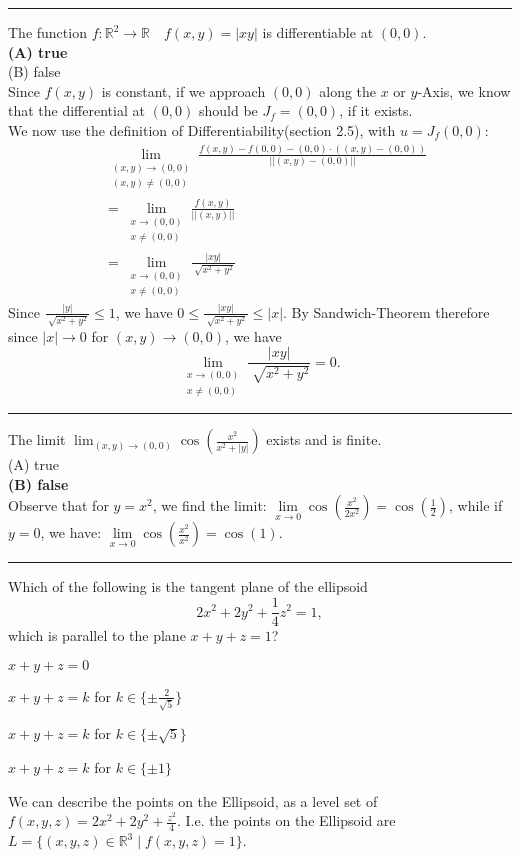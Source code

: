 \documentclass[a4paper,fontsize = 10pt]{article}
\newcommand{\cmark}{\ding{51}}%
\newcommand{\correct}{\rlap{$\square$}{\raisebox{2pt}{\hspace{1pt}\cmark}}\hspace{-2.5pt}}
\def\R{\mathbb{R}}
\begin{document}
\vspace{0.1 cm}
\hrule
\vspace{0.2 cm}
The function $f: \R^2 \to \R \quad f(x,y) = |xy|$ is differentiable at $(0,0)$.
\\\textbf{(A) true}
\\(B) false
\\Since $f(x,y)$ is constant, if we approach $(0,0)$ along the $x$ or $y$-Axis, we know that the differential at $(0,0)$ should be $J_f = (0,0)$, if it exists.
\\We now use the definition of Differentiability(section 2.5), with $u = J_f(0,0)$:
\begin{align*}
  &\lim_{\substack{(x,y) \to (0,0) \\ (x,y) \neq (0,0)}} \frac{f(x,y)-f(0,0)-(0,0)\cdot((x,y)-(0,0))}{||(x,y)-(0,0)||}\\
  &= \lim_{\substack{x \to (0,0) \\ x \neq (0,0)}} \frac{f(x,y)}{||(x,y)||}\\
  &= \lim_{\substack{x \to (0,0) \\ x \neq (0,0)}} \frac{|xy|}{\sqrt[]{x^2+y^2}}
\end{align*}
Since $\frac{|y|}{\sqrt[]{x^2+y^2}} \leq 1$, we have $0 \leq\frac{|xy|}{\sqrt[]{x^2+y^2}} \leq |x|$. 
By Sandwich-Theorem therefore since $|x| \to 0$ for $(x,y) \to (0,0)$, we have 
\[\lim_{\substack{x \to (0,0) \\ x \neq (0,0)}} \frac{|xy|}{\sqrt[]{x^2+y^2}} = 0.\]
\vspace{0.1cm}
\hrule
\vspace{0.2cm}
The limit $\lim_{(x,y) \to (0,0)} \cos(\frac{x^2}{x^2 + |y|})$ exists and is finite.
\\(A) true
\\\textbf{(B) false}
\\Observe that for $y=x^2$, we find the limit: $\underset{x \to 0}{\lim} \cos \left ( \frac {x^2}{2x^2}\right ) = \cos \left ( \frac 1 2 \right )$, while if $y=0$, we have: $\underset{x \to 0}{\lim} \cos \left ( \frac {x^2}{x^2}\right ) = \cos (1)$.

\vspace{0.1cm}
\hrule
\vspace{0.2cm}

Which of the following is the tangent plane of the ellipsoid \[2x^2 + 2y^2 + \frac{1}{4}z^2 = 1,\] which is parallel to the plane $x + y + z = 1$?
\begin{Checkboxes}
  \item $x + y + z = 0$
  \item \(x+y+z = k\) for \(k \in \{\pm\frac{2}{\sqrt{5}}\}\)
  \item [\correct] \(x + y + z = k\) for $k \in \{\pm \sqrt{5}\}$
  \item \(x + y + z = k\) for $k \in \{\pm 1\}$
\end{Checkboxes}
We can describe the points on the Ellipsoid, as a level set of \(f(x, y, z) = 2x^2 + 2y^2 + \frac{z^2}{4}\). I.e. the points on the Ellipsoid are $L = \{(x,y,z) \in \R^3 \mid f(x,y,z) = 1\}$.
\end{document}
